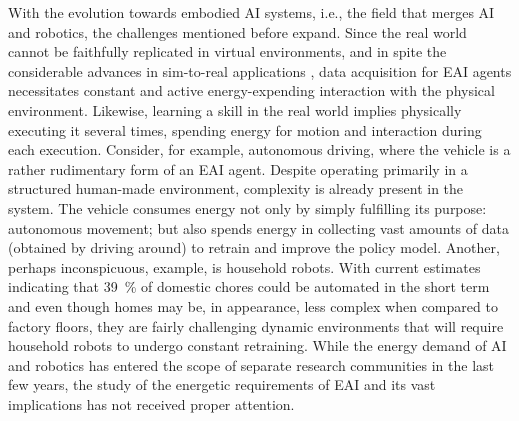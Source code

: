 With the evolution towards embodied AI systems, i.e., the field that merges AI and robotics, the challenges mentioned before expand. Since the real world cannot be faithfully replicated in virtual environments, and in spite the considerable advances in sim-to-real applications \cite{Chebotar2019Closingsimreal}, data acquisition for EAI agents necessitates constant and active energy-expending interaction with the physical environment. Likewise, learning a skill in the real world implies physically executing it several times, spending energy for motion and interaction during each execution. Consider, for example, autonomous driving, where the vehicle is a rather rudimentary form of an EAI agent. Despite operating primarily in a structured human-made environment, complexity is already present in the system. The vehicle consumes energy not only by simply fulfilling its purpose: autonomous movement; but also spends energy in collecting vast amounts of data (obtained by driving around) to retrain and improve the policy model. Another, perhaps inconspicuous, example, is household robots. With current estimates indicating that 39~\%  of domestic chores could be automated in the short term \cite{Lehdonvirta2022futuresunpaidwork} and even though homes may be, in appearance, less complex when compared to factory floors, they are fairly challenging dynamic environments that will require household robots to undergo constant retraining. While the energy demand of AI and robotics has entered the scope of separate research communities in the last few years, the study of the energetic requirements of EAI and its vast implications has not received proper attention. 

